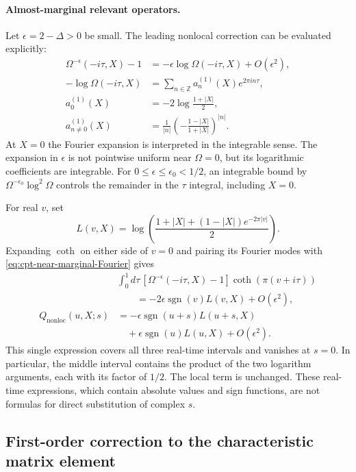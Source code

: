 \documentclass[a4paper,11pt]{article}
\theoremstyle{definition}
\begin{document}
\paragraph{Almost-marginal relevant operators.}
Let $\epsilon=2-\Delta>0$ be small. The leading nonlocal correction can be evaluated explicitly:
\begin{align}
 \Omega^{-\epsilon}(-i\tau,X)-1
 &=-\epsilon\log\Omega(-i\tau,X)+O(\epsilon^2),\nonumber\\
 -\log\Omega(-i\tau,X)&=\sum_{n\in\mathbb Z}a_n^{(1)}(X)e^{2\pi in\tau},\nonumber\\
 a_0^{(1)}(X)&=-2\log\frac{1+|X|}{2},\nonumber\\
 a_{n\ne0}^{(1)}(X)&=\frac1{|n|}
 \left(-\frac{1-|X|}{1+|X|}\right)^{|n|}.
 \label{eq:cpt-near-marginal-Fourier}
\end{align}
At $X=0$ the Fourier expansion is interpreted in the integrable sense. The expansion in $\epsilon$ is not pointwise uniform near $\Omega=0$, but its logarithmic coefficients are integrable. For $0\leq\epsilon\leq\epsilon_0<1/2$, an integrable bound by $\Omega^{-\epsilon_0}\log^2\Omega$ controls the remainder in the $\tau$ integral, including $X=0$.

For real $v$, set
\begin{equation}
 L(v,X)=\log\left(\frac{1+|X|+(1-|X|)e^{-2\pi|v|}}{2}\right).
\end{equation}
Expanding $\coth$ on either side of $v=0$ and pairing its Fourier modes with \eqref{eq:cpt-near-marginal-Fourier} gives
\begin{align}
 &\int_0^1d\tau\,[\Omega^{-\epsilon}(-i\tau,X)-1]
 \coth(\pi(v+i\tau))\nonumber\\
 &\qquad=-2\epsilon\operatorname{sgn}(v)L(v,X)+O(\epsilon^2),\nonumber\\
 Q_{\mathrm{nonloc}}(u,X;s)
 &=-\epsilon\operatorname{sgn}(u+s)L(u+s,X)\nonumber\\
 &\quad+\epsilon\operatorname{sgn}(u)L(u,X)+O(\epsilon^2).
 \label{eq:cpt-near-marginal-Q}
\end{align}
This single expression covers all three real-time intervals and vanishes at $s=0$. In particular, the middle interval contains the product of the two logarithm arguments, each with its factor of $1/2$. The local term is unchanged. These real-time expressions, which contain absolute values and sign functions, are not formulas for direct substitution of complex $s$.

\subsection{First-order correction to the characteristic matrix element}
\end{document}
